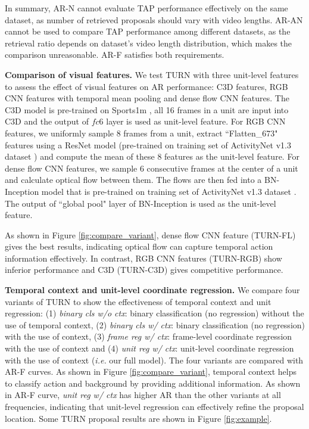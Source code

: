 \documentclass[10pt,twocolumn,letterpaper]{article}
\begin{document}
In summary, AR-N cannot evaluate TAP performance effectively on the same dataset, as number of retrieved proposals should vary with video lengths. AR-AN cannot be used to compare TAP performance among different datasets, as the retrieval ratio depends on dataset's video length distribution, which makes the comparison unreasonable. AR-F satisfies both requirements. 




\textbf{Comparison of visual features.} We test TURN with three unit-level features to assess the effect of visual features on AR performance: C3D \cite{tran2015learning} features, RGB CNN features with temporal mean pooling and dense flow CNN \cite{xiong2016cuhk} features. The C3D model is pre-trained on Sports1m \cite{Karpathy_2014_CVPR}, all 16 frames in a unit are input into C3D and the output of $fc$6 layer is used as unit-level feature. For RGB CNN features, we  uniformly sample 8 frames from a unit, extract ``Flatten\_673" features using a ResNet \cite{He_2016_CVPR} model (pre-trained on training set of ActivityNet v1.3 dataset \cite{xiong2016cuhk}) and compute the mean of these 8 features as the unit-level feature. For dense flow CNN features, we sample $6$ consecutive frames at the center of a unit and calculate optical flow \cite{farneback2003two} between them. The flows are then fed into a BN-Inception model \cite{xiong2016cuhk,ioffe2015batch} that is pre-trained on training set of ActivityNet v1.3 dataset \cite{xiong2016cuhk}. The output of ``global pool" layer of BN-Inception is used as the unit-level feature.

As shown in Figure \ref{fig:compare_variant}, dense flow CNN feature (TURN-FL) gives the best results, indicating optical flow can capture temporal action information effectively. In contrast, RGB CNN features (TURN-RGB) show inferior performance and C3D (TURN-C3D) gives competitive performance.


\textbf{Temporal context and unit-level coordinate regression.} We compare four variants of TURN to show the effectiveness of temporal context and unit regression: (1) \textit{binary cls w/o ctx}: binary classification (no regression) without the use of temporal context, (2) \textit{binary cls w/ ctx}: binary classification (no regression) with the use of context, (3) \textit{frame reg w/ ctx}: frame-level coordinate regression with the use of context and (4) \textit{unit reg w/ ctx}: unit-level coordinate regression with the use of context (\emph{i.e.} our full model). The four variants are compared with AR-F curves. As shown in Figure \ref{fig:compare_variant}, temporal context helps to classify action and background by providing additional information. As shown in AR-F curve, \textit{unit reg w/ ctx} has higher AR than the other variants at all frequencies, indicating that unit-level regression can effectively refine the proposal location. Some TURN proposal results are shown in Figure \ref{fig:example}.
\end{document}
